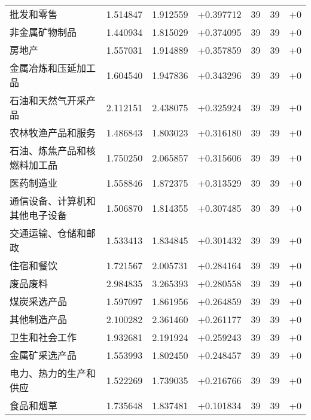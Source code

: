 \begin{table}[htbp]
\begin{tabular}{lrrrrrr}
批发和零售 & 1.514847 & 1.912559 & +0.397712 & 39 & 39 & +0 \\
非金属矿物制品 & 1.440934 & 1.815029 & +0.374095 & 39 & 39 & +0 \\
房地产 & 1.557031 & 1.914889 & +0.357859 & 39 & 39 & +0 \\
金属冶炼和压延加工品 & 1.604540 & 1.947836 & +0.343296 & 39 & 39 & +0 \\
石油和天然气开采产品 & 2.112151 & 2.438075 & +0.325924 & 39 & 39 & +0 \\
农林牧渔产品和服务 & 1.486843 & 1.803023 & +0.316180 & 39 & 39 & +0 \\
石油、炼焦产品和核燃料加工品 & 1.750250 & 2.065857 & +0.315606 & 39 & 39 & +0 \\
医药制造业 & 1.558846 & 1.872375 & +0.313529 & 39 & 39 & +0 \\
通信设备、计算机和其他电子设备 & 1.506870 & 1.814355 & +0.307485 & 39 & 39 & +0 \\
交通运输、仓储和邮政 & 1.533413 & 1.834845 & +0.301432 & 39 & 39 & +0 \\
住宿和餐饮 & 1.721567 & 2.005731 & +0.284164 & 39 & 39 & +0 \\
废品废料 & 2.984835 & 3.265393 & +0.280558 & 39 & 39 & +0 \\
煤炭采选产品 & 1.597097 & 1.861956 & +0.264859 & 39 & 39 & +0 \\
其他制造产品 & 2.100282 & 2.361460 & +0.261177 & 39 & 39 & +0 \\
卫生和社会工作 & 1.932681 & 2.191924 & +0.259243 & 39 & 39 & +0 \\
金属矿采选产品 & 1.553993 & 1.802450 & +0.248457 & 39 & 39 & +0 \\
电力、热力的生产和供应 & 1.522269 & 1.739035 & +0.216766 & 39 & 39 & +0 \\
食品和烟草 & 1.735648 & 1.837481 & +0.101834 & 39 & 39 & +0 \\
\bottomrule
\end{tabular}
\end{table}

